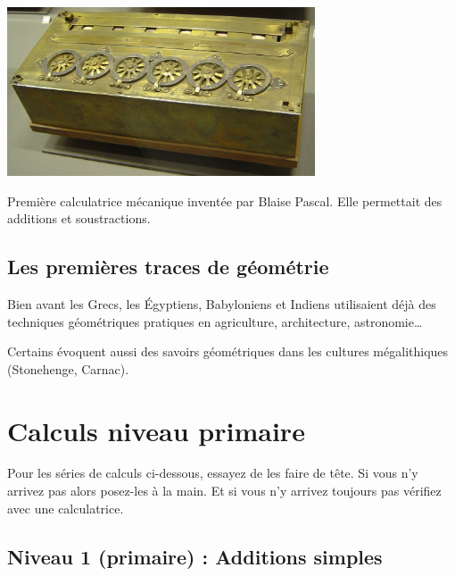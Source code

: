 \documentclass[11pt]{article}
\begin{document}
\begin{center}
\includegraphics[width=0.8\linewidth, height=5cm, keepaspectratio]{./images/pascaline.jpg}
\end{center}

Première calculatrice mécanique inventée par Blaise Pascal. Elle
permettait des additions et soustractions.


\newpage

\subsection{Les premières traces de géométrie}
\label{sec:org4f039b9}

Bien avant les Grecs, les Égyptiens, Babyloniens et Indiens
utilisaient déjà des techniques géométriques pratiques en agriculture,
architecture, astronomie\ldots{}


Certains évoquent aussi des savoirs géométriques dans les cultures
mégalithiques (Stonehenge, Carnac).


\newpage

\section{Calculs niveau primaire}
\label{sec:orgb97d643}


Pour les séries de calculs ci-dessous, essayez de les faire de
tête. Si vous n'y arrivez pas alors posez-les à la main. Et si vous
n'y arrivez toujours pas vérifiez avec une calculatrice.

\newpage

\subsection{Niveau 1 (primaire) : Additions simples}
\label{sec:org5c1bb6d}
\label{org3b22036}
\end{document}
